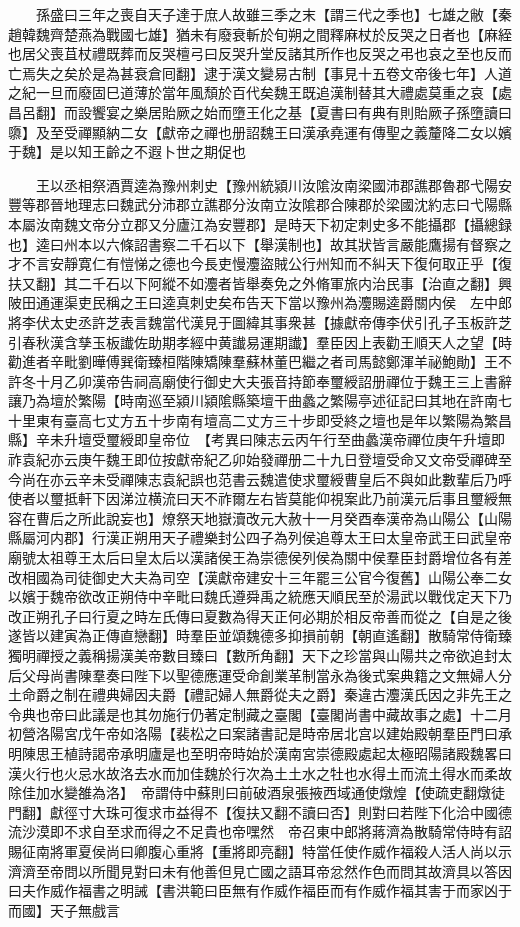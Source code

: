 　　孫盛曰三年之喪自天子達于庶人故雖三季之末【謂三代之季也】七雄之敝【秦趙韓魏齊楚燕為戰國七雄】猶未有廢衰斬於旬朔之間釋麻杖於反哭之日者也【麻絰也居父喪苴杖禮既葬而反哭檀弓曰反哭升堂反諸其所作也反哭之弔也哀之至也反而亡焉失之矣於是為甚衰倉囘翻】逮于漢文變易古制【事見十五卷文帝後七年】人道之紀一旦而廢固巳道薄於當年風頹於百代矣魏王既追漢制替其大禮處莫重之哀【處昌呂翻】而設饗宴之樂居貽厥之始而墮王化之基【夏書曰有典有則貽厥子孫墮讀曰隳】及至受禪顯納二女【獻帝之禪也册詔魏王曰漢承堯運有傳聖之義釐降二女以嬪于魏】是以知王齡之不遐卜世之期促也

　　王以丞相祭酒賈逵為豫州刺史【豫州統潁川汝隂汝南梁國沛郡譙郡魯郡弋陽安豐等郡晉地理志曰魏武分沛郡立譙郡分汝南立汝隂郡合陳郡於梁國沈約志曰弋陽縣本屬汝南魏文帝分立郡又分廬江為安豐郡】是時天下初定刺史多不能攝郡【攝總録也】逵曰州本以六條詔書察二千石以下【舉漢制也】故其狀皆言嚴能鷹揚有督察之才不言安靜寛仁有愷悌之德也今長吏慢灋盜賊公行州知而不糾天下復何取正乎【復扶又翻】其二千石以下阿縱不如灋者皆舉奏免之外脩軍旅内治民事【治直之翻】興陂田通運渠吏民稱之王曰逵真刺史矣布告天下當以豫州為灋賜逵爵關内侯　左中郎將李伏太史丞許芝表言魏當代漢見于圖緯其事衆甚【據獻帝傳李伏引孔子玉板許芝引春秋漢含孳玉板䜟佐助期孝經中黄䜟易運期䜟】羣臣因上表勸王順天人之望【時勸進者辛毗劉曄傅巽衛臻桓階陳矯陳羣蘇林董巴繼之者司馬懿鄭渾羊祕鮑勛】王不許冬十月乙卯漢帝告祠高廟使行御史大夫張音持節奉璽綬詔册禪位于魏王三上書辭讓乃為壇於繁陽【時南巡至潁川潁隂縣築壇干曲蠡之繁陽亭述征記曰其地在許南七十里東有臺高七丈方五十步南有壇高二丈方三十步即受終之壇也是年以繁陽為繁昌縣】辛未升壇受璽綬即皇帝位　【考異曰陳志云丙午行至曲蠡漢帝禪位庚午升壇即祚袁紀亦云庚午魏王即位按獻帝紀乙卯始發禪册二十九日登壇受命又文帝受禪碑至今尚在亦云辛未受禪陳志袁紀誤也范書云魏遣使求璽綬曹皇后不與如此數輩后乃呼使者以璽抵軒下因涕泣横流曰天不祚爾左右皆莫能仰視案此乃前漢元后事且璽綬無容在曹后之所此說妄也】燎祭天地嶽瀆改元大赦十一月癸酉奉漢帝為山陽公【山陽縣屬河内郡】行漢正朔用天子禮樂封公四子為列侯追尊太王曰太皇帝武王曰武皇帝廟號太祖尊王太后曰皇太后以漢諸侯王為崇德侯列侯為關中侯羣臣封爵增位各有差改相國為司徒御史大夫為司空【漢獻帝建安十三年罷三公官今復舊】山陽公奉二女以嬪于魏帝欲改正朔侍中辛毗曰魏氏遵舜禹之統應天順民至於湯武以戰伐定天下乃改正朔孔子曰行夏之時左氏傳曰夏數為得天正何必期於相反帝善而從之【自是之後遂皆以建寅為正傳直戀翻】時羣臣並頌魏德多抑損前朝【朝直遙翻】散騎常侍衛臻獨明禪授之義稱揚漢美帝數目臻曰【數所角翻】天下之珍當與山陽共之帝欲追封太后父母尚書陳羣奏曰陛下以聖德應運受命創業革制當永為後式案典籍之文無婦人分土命爵之制在禮典婦因夫爵【禮記婦人無爵從夫之爵】秦違古灋漢氏因之非先王之令典也帝曰此議是也其勿施行仍著定制藏之臺閣【臺閣尚書中藏故事之處】十二月初營洛陽宮戊午帝如洛陽【裴松之曰案諸書記是時帝居北宫以建始殿朝羣臣門曰承明陳思王植詩謁帝承明廬是也至明帝時始於漢南宮崇德殿處起太極昭陽諸殿魏畧曰漢火行也火忌水故洛去水而加佳魏於行次為土土水之牡也水得土而流土得水而柔故除佳加水變雒為洛】　帝謂侍中蘇則曰前破酒泉張掖西域通使燉煌【使疏吏翻燉徒門翻】獻徑寸大珠可復求市益得不【復扶又翻不讀曰否】則對曰若陛下化洽中國德流沙漠即不求自至求而得之不足貴也帝嘿然　帝召東中郎將蔣濟為散騎常侍時有詔賜征南將軍夏侯尚曰卿腹心重將【重將即亮翻】特當任使作威作福殺人活人尚以示濟濟至帝問以所聞見對曰未有他善但見亡國之語耳帝忿然作色而問其故濟具以答因曰夫作威作福書之明誡【書洪範曰臣無有作威作福臣而有作威作福其害于而家凶于而國】天子無戲言